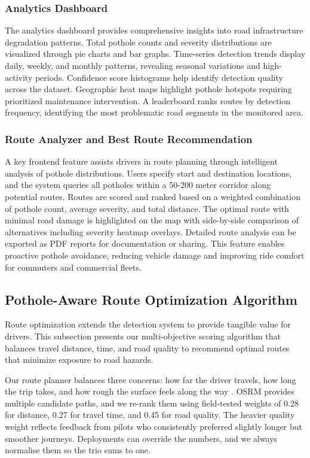 \documentclass{ieeeaccess}
\begin{document}
\subsubsection{Analytics Dashboard}
The analytics dashboard provides comprehensive insights into road infrastructure degradation patterns. Total pothole counts and severity distributions are visualized through pie charts and bar graphs. Time-series detection trends display daily, weekly, and monthly patterns, revealing seasonal variations and high-activity periods. Confidence score histograms help identify detection quality across the dataset. Geographic heat maps highlight pothole hotspots requiring prioritized maintenance intervention. A leaderboard ranks routes by detection frequency, identifying the most problematic road segments in the monitored area.

\subsubsection{Route Analyzer and Best Route Recommendation}
A key frontend feature assists drivers in route planning through intelligent analysis of pothole distributions. Users specify start and destination locations, and the system queries all potholes within a 50-200 meter corridor along potential routes. Routes are scored and ranked based on a weighted combination of pothole count, average severity, and total distance. The optimal route with minimal road damage is highlighted on the map with side-by-side comparison of alternatives including severity heatmap overlays. Detailed route analysis can be exported as PDF reports for documentation or sharing. This feature enables proactive pothole avoidance, reducing vehicle damage and improving ride comfort for commuters and commercial fleets.

\subsection{Pothole-Aware Route Optimization Algorithm}

Route optimization extends the detection system to provide tangible value for drivers. This subsection presents our multi-objective scoring algorithm that balances travel distance, time, and road quality to recommend optimal routes that minimize exposure to road hazards.

Our route planner balances three concerns: how far the driver travels, how long the trip takes, and how rough the surface feels along the way \cite{b16, b17}. OSRM provides multiple candidate paths, and we re-rank them using field-tested weights of 0.28 for distance, 0.27 for travel time, and 0.45 for road quality. The heavier quality weight reflects feedback from pilots who consistently preferred slightly longer but smoother journeys. Deployments can override the numbers, and we always normalise them so the trio sums to one.
\end{document}

